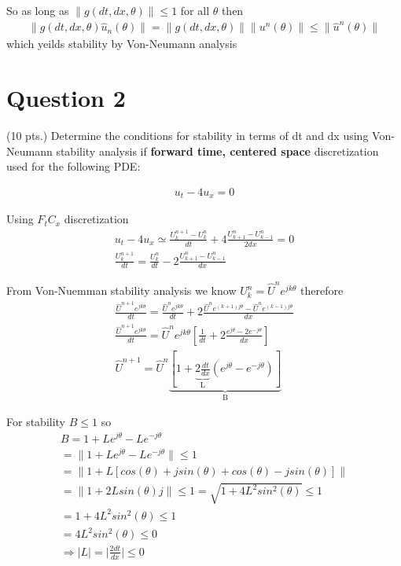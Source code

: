 \documentclass{article}
\begin{document}
So as long as $\| g(dt, dx, \theta) \| \leq 1 $ for all $\theta $ then
\begin{gather*}
  \|g(dt,dx,\theta)\hat{u}_{n}(\theta)\| = \|g(dt,dx,\theta)\| \|u^{n}(\theta) \| \leq \| \hat{u}^{n}(\theta) \|
\end{gather*}
which yeilds stability by Von-Neumann analysis



\section*{Question 2}
(10 pts.) Determine the conditions for stability in terms of dt and dx using Von-Neumann
stability analysis if \textbf{forward time, centered space} discretization used for the following PDE:

\begin{gather*}
	u_{t} - 4u_{x} = 0
\end{gather*}

Using $F_{t}C_{x}$ discretization
\begin{gather*}
	u_{t} - 4u_{x} \simeq \frac{U^{n+1}_{k} - U^{n}_{k}}{dt} + 4\frac{U^{n}_{k+1} - U^{n}_{k-1}}{2dx} = 0\\
	\frac{U^{n+1}_{k}}{dt} = \frac{U^{n}_{k}}{dt} - 2\frac{U^{n}_{k+1} - U^{n}_{k-1}}{dx}
\end{gather*}

From Von-Nuemman stability analysis we know $U^{n}_{k} = \hat{U}^{n}e^{jk\theta}$ therefore
\begin{gather*}
	\frac{\hat{U}^{n+1}e^{jk\theta}}{dt} = \frac{\hat{U}^{n}e^{jk\theta}}{dt} + 2\frac{\hat{U}^{n}e^{(k+1)j\theta} - \hat{U}^{n}e^{(k-1)j\theta}}{dx}\\
	\frac{\hat{U}^{n+1}e^{jk\theta}}{dt} = \hat{U}^{n}e^{jk\theta} \left[  \frac{1}{dt} + 2\frac{e^{j\theta} - 2e^{-j\theta}}{dx}\right]\\
	\hat{U}^{n+1} = \hat{U}^{n}\underbrace{\left[ 1 + \underbrace{ 2\frac{dt}{dx}}_{\text{L}}\left(e^{j\theta} - e^{-j\theta}\right) \right]}_{\text{B}}
\end{gather*}

For stability $B \leq 1$ so
\begin{gather*}
B = 1 + Le^{j\theta} - Le^{-j\theta} \\
= \| 1+ Le^{j\theta} - Le^{-j\theta} \| \leq 1\\
= \| 1 + L \left[ cos(\theta) + jsin(\theta) + cos(\theta) - jsin(\theta) \right] \| \\
= \| 1 + 2L sin(\theta)j \| \leq 1
= \sqrt{1 + 4L^{2} sin^{2}(\theta)}  \leq 1 \\
= 1 + 4L^{2} sin^{2}(\theta)  \leq 1 \\
= 4L^{2} sin^{2}(\theta)  \leq 0 \\
\Rightarrow \mid L \mid = \mid \frac{2dt}{dx} \mid \leq 0\\
\end{gather*}
\end{document}
